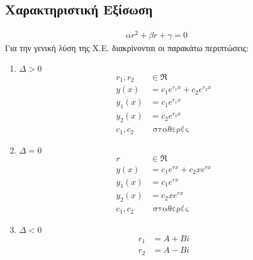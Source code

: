 \documentclass[]{book}
\begin{document}
\begin{multicols*}{2}
\subsection{Χαρακτηριστική Eξίσωση}
\begin{equation*}
    \begin{aligned}
        \alpha r^2 + \beta r + \gamma = 0
    \end{aligned}
\end{equation*}
Για την γενική λύση της Χ.Ε. διακρίνονται οι παρακάτω περιπτώσεις:
\begin{enumerate}
    \item $Δ>0$
            \begin{equation*}
                \begin{aligned}
                    r_1, r_2 & \in \Re                       \\
                    y(x)     & = c_1 e^{r_1x} + c_2 e^{r_2x} \\
                    y_1(x)   & = c_1 e^{r_1x}                \\
                    y_2(x)   & = c_2 e^{r_2x}                \\
                    c_1, c_2 & \text{ σταθερές}
                \end{aligned}
            \end{equation*}
    \item $Δ=0$
            \begin{equation*}
                \begin{aligned}
                    r        & \in \Re                     \\
                    y(x)     & = c_1 e^{rx} + c_2 x e^{rx} \\
                    y_1(x)   & = c_1 e^{rx}                \\
                    y_2(x)   & = c_2 x e^{rx}              \\
                    c_1, c_2 & \text{ σταθερές}
                \end{aligned}
            \end{equation*}
    \item $Δ<0$
            \begin{equation*}
                \begin{aligned}
                    r_1                      & = A + Bi                                    \\
                    r_2                      & = A - Bi                                    \\

\end{aligned}
\end{equation*}
\end{enumerate}
\end{multicols*}
\end{document}
